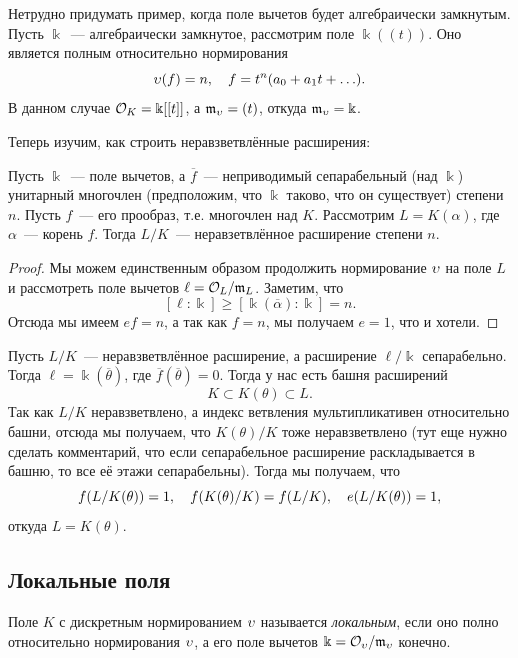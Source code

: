	 \begin{example}
	 	Нетрудно придумать пример, когда поле вычетов будет алгебраически замкнутым. Пусть $\Bbbk$~--- алгебраически замкнутое, рассмотрим поле $\Bbbk((t))$. Оно является полным относительно нормирования 
	 	\[
	 		\upsilon(f) = n, \quad f = t^n (a_0 + a_1 t + \ldots ).
	 	\]
	 	В данном случае $\mathcal{O}_{K} = \Bbbk[[t]]$, а $\mathfrak{m}_{\upsilon} = (t)$, откуда $\mathfrak{m}_{\upsilon} = \Bbbk$. 
	 \end{example}

	 Теперь изучим, как строить неравзветвлённые расширения: 

	 \begin{statement} 
			 Пусть $\Bbbk$~--- поле вычетов, а $\overline{f}$~--- неприводимый сепарабельный (над $\Bbbk$) унитарный многочлен (предположим, что $\Bbbk$ таково, что он существует) степени $n$. Пусть $f$~--- его прообраз, т.е. многочлен над $K$.  Рассмотрим $L = K(\alpha)$, где $\alpha$~--- корень $f$.  Тогда $L/K$~--- неравзетвлённое расширение степени $n$.	
	 \end{statement}
	 \begin{proof}
	 	Мы можем единственным образом продолжить нормирование $\upsilon$ на поле $L$ и рассмотреть поле вычетов $\ell = \mathcal{O}_{L}/\mathfrak{m}_{L}$. Заметим, что 
	 	\[
	 		[\ell : \Bbbk] \ge [\Bbbk(\overline{\alpha}) : \Bbbk] = n.
	 	\]
	 	Отсюда мы имеем $ef = n$, а так как $f = n$, мы получаем $e = 1$, что и хотели. 
	 \end{proof}

	 Пусть $L/K$~--- неравзветвлённое расширение, а расширение $\ell/\Bbbk$ сепарабельно. Тогда $\ell = \Bbbk(\overline{\theta})$, где $\overline{f}(\overline{\theta}) = 0$. Тогда у нас есть башня расширений 
	 \[
	 	K \subset K(\theta) \subset L.
	 \]
	 Так как $L/K$ неравзветвлено, а индекс ветвления мультипликативен относительно башни, отсюда мы получаем, что $K(\theta)/K$ тоже неравзветвлено (тут еще нужно сделать комментарий, что если сепарабельное расширение раскладывается в башню, то все её этажи сепарабельны).  Тогда мы получаем, что 
	 \[
	 	f\lr*{L/K(\theta)} = 1, \quad f\lr*{K(\theta)/K} = f\lr*{L/K}, \quad e\lr*{L/K(\theta)} = 1,
	 \]
	 откуда $L = K(\theta)$.

	 \subsection{Локальные поля}

	 \begin{definition} 
	 	Поле $K$ с дискретным нормированием $\upsilon$ называется \emph{локальным}, если оно полно относительно нормирования $\upsilon$, а его поле вычетов $\Bbbk = \mathcal{O}_{\upsilon}/\mathfrak{m}_{\upsilon}$  конечно. 
	 \end{definition}

